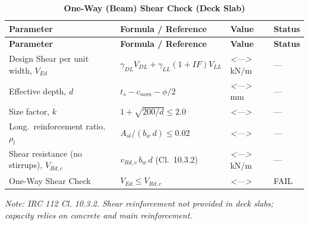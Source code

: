 \documentclass[12pt,a4paper]{report}
\numberwithin{table}{chapter}
\numberwithin{figure}{chapter}
\newcommand{\reportrowpad}{4pt}
\newcommand{\reportsectiongap}{0.75em}
\newcommand{\placeholder}[1]{\textit{\textless #1\textgreater}}
\begin{document}
\vspace{\reportsectiongap}
\begin{longtable}{|L{5.5cm}|C{3.5cm}|>{\centering\arraybackslash}p{4.5cm}|C{2cm}|}
\caption{\textbf{One-Way (Beam) Shear Check (Deck Slab)}}\\
\hline
\textbf{Parameter} & \textbf{Formula / Reference} & \textbf{Value} & \textbf{Status} \\[\reportrowpad]
\hline
\endfirsthead
\hline
\textbf{Parameter} & \textbf{Formula / Reference} & \textbf{Value} & \textbf{Status} \\[\reportrowpad]
\hline
\endhead
Design Shear per unit width, $V_{Ed}$ & $\gamma_{DL} V_{DL} + \gamma_{LL}(1{+}IF)V_{LL}$ & \placeholder{---} kN/m & --- \\[\reportrowpad]
\hline
Effective depth, $d$ & $t_s - c_{nom} - \phi/2$ & \placeholder{---} mm & --- \\[\reportrowpad]
\hline
Size factor, $k$ & $1 + \sqrt{200/d} \leq 2.0$ & \placeholder{---} & --- \\[\reportrowpad]
\hline
Long.\ reinforcement ratio, $\rho_l$ & $A_{sl}/(b_w\,d) \leq 0.02$ & \placeholder{---} & --- \\[\reportrowpad]
\hline
Shear resistance (no stirrups), $V_{Rd,c}$ & $v_{Rd,c}\,b_w\,d$ (Cl.\ 10.3.2) & \placeholder{---} kN/m & --- \\[\reportrowpad]
\hline
One-Way Shear Check & $V_{Ed} \leq V_{Rd,c}$ & \placeholder{---} & FAIL \\[\reportrowpad]
\hline
\end{longtable}
\noindent\textit{Note: IRC 112 Cl. 10.3.2. Shear reinforcement not provided in deck slabs; capacity relies on concrete and main reinforcement.}
\end{document}
